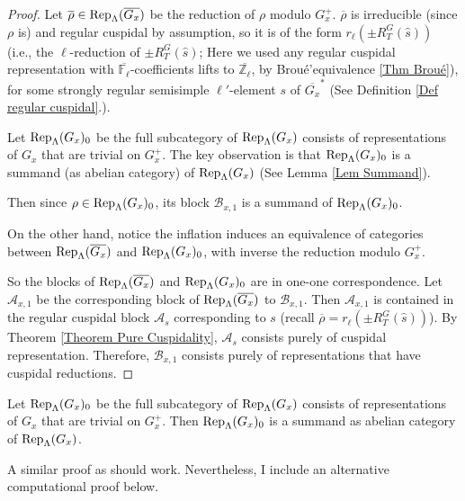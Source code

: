 	\begin{proof}
		Let $\overline{\rho} \in \operatorname{\operatorname{Rep}}_{\Lambda}(\overline{G_x})$ be the reduction of $\rho$ modulo $G_x^+$. $\overline{\rho}$ is irreducible (since $\rho$ is) and regular cuspidal by assumption, so it is of the form $r_{\ell}(\pm R_T^G(\hat{s}))$ (i.e., the $\ell$-reduction of $\pm R_T^G(\hat{s})$; Here we used any regular cuspidal representation with $\overline{\mathbb{F}_{\ell}}$-coefficients lifts to $\overline{\mathbb{Z}_{\ell}}$, by Broué'equivalence \ref{Thm Broué}), for some strongly regular semisimple $\ell'$-element $s$ of $\overline{G_x}^*$ (See Definition \ref{Def regular cuspidal}.). 
		
		Let $\operatorname{\operatorname{Rep}}_{\Lambda}(G_x)_0$ be the full subcategory of $\operatorname{\operatorname{Rep}}_{\Lambda}(G_x)$ consists of representations of $G_x$ that are trivial on $G_x^+$. The key observation is that $\operatorname{\operatorname{Rep}}_{\Lambda}(G_x)_0$ is a summand (as abelian category) of $\operatorname{\operatorname{Rep}}_{\Lambda}(G_x)$ (See Lemma \ref{Lem Summand}).
		
		Then since $\rho \in \operatorname{\operatorname{Rep}}_{\Lambda}(G_x)_0$, its block $\mathcal{B}_{x,1}$ is a summand of $\operatorname{\operatorname{Rep}}_{\Lambda}(G_x)_0$.
		
		On the other hand, notice the inflation induces an equivalence of categories between $\operatorname{\operatorname{Rep}}_{\Lambda}(\overline{G_x})$ and $\operatorname{\operatorname{Rep}}_{\Lambda}(G_x)_0$, with inverse the reduction modulo $G_x^+$.
		
		So the blocks of $\operatorname{\operatorname{Rep}}_{\Lambda}(\overline{G_x})$ and $\operatorname{\operatorname{Rep}}_{\Lambda}(G_x)_0$ are in one-one correspondence. Let $\mathcal{A}_{x,1}$ be the corresponding block of $\operatorname{\operatorname{Rep}}_{\Lambda}(\overline{G_x})$ to $\mathcal{B}_{x,1}$. Then $\mathcal{A}_{x,1}$ is contained in the regular cuspidal block $\mathcal{A}_s$ corresponding to $s$ (recall $\overline{\rho}=r_{\ell}(\pm R_T^G(\hat{s}))$). By Theorem \ref{Theorem Pure Cuspidality}, $\mathcal{A}_s$ consists purely of cuspidal representation. Therefore, $\mathcal{B}_{x,1}$ consists purely of representations that have cuspidal reductions. 
	\end{proof}
	
	\begin{lemma}\label{Lem Summand}
		Let $\operatorname{\operatorname{Rep}}_{\Lambda}(G_x)_0$ be the full subcategory of $\operatorname{\operatorname{Rep}}_{\Lambda}(G_x)$ consists of representations of $G_x$ that are trivial on $G_x^+$. Then $\operatorname{\operatorname{Rep}}_{\Lambda}(G_x)_0$ is a summand as abelian category of $\operatorname{\operatorname{Rep}}_{\Lambda}(G_x)$.
	\end{lemma}
	
	\begin{remark}
		A similar proof as \cite[Appendix]{dat2009finitude} should work. Nevertheless, I include an alternative computational proof below. 
	\end{remark}
	
